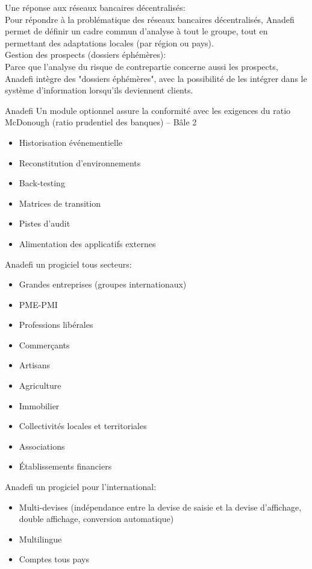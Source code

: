 {\large{Une réponse aux réseaux bancaires décentralisés:}}\\
Pour répondre à la problématique des réseaux bancaires décentralisés, Anadefi permet de définir un cadre commun d’analyse à tout le groupe, tout en permettant des adaptations locales (par région ou pays).\\

{\large{Gestion des prospects (dossiers éphémères):}}\\
Parce que l’analyse du risque de contrepartie concerne aussi les prospects, Anadefi intègre des "dossiers éphémères", avec la possibilité de les intégrer dans le système d’information lorsqu’ils deviennent clients.

\newpage
{\large{Anadefi Un module optionnel assure la conformité}} 
 avec les exigences du ratio McDonough (ratio prudentiel des banques) – Bâle 2
\begin{itemize}
\item Historisation événementielle
\item Reconstitution d’environnements
\item Back-testing
\item Matrices de transition
\item Pistes d’audit
\item Alimentation des applicatifs externes\\
\end{itemize}
{\large{Anadefi un progiciel tous secteurs:}}

\begin{itemize}
\item Grandes entreprises (groupes internationaux)
\item PME-PMI
\item Professions libérales
\item Commerçants
\item Artisans
\item Agriculture
\item Immobilier
\item Collectivités locales et territoriales
\item Associations
\item Établissements financiers\\
\end{itemize}

{\large{Anadefi un progiciel pour l’international:}}
\begin{itemize}
\item Multi-devises (indépendance entre la devise de 
saisie et la devise d’affichage, double affichage, conversion automatique)
\item Multilingue
\item Comptes tous pays\\
\end{itemize}

